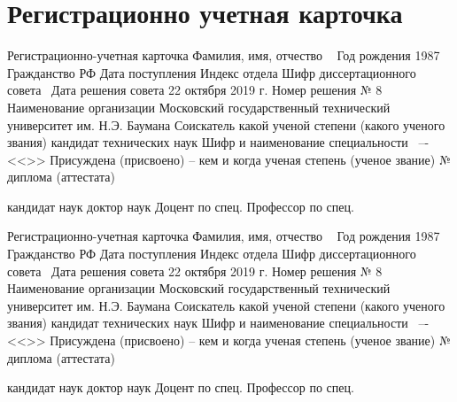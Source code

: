 
\section{Регистрационно учетная карточка}

Регистрационно-учетная карточка
Фамилия, имя, отчество	\thesisAuthorLastName~\thesisAuthorOtherNames
Год рождения
1987	Гражданство
РФ	Дата поступления	Индекс отдела
Шифр диссертационного совета \	Дата решения совета
22 октября 2019 г.	Номер решения
№ 8
Наименование организации Московский государственный
технический университет им. Н.Э. Баумана
Соискатель какой ученой степени
(какого ученого звания)
кандидат технических наук	Шифр и наименование специальности
\thesisSpecialtyNumber\ –- <<\thesisSpecialtyTitle>>
Присуждена (присвоено) – кем и когда ученая степень (ученое звание)
№ диплома (аттестата)

кандидат наук	
доктор наук	
Доцент по спец.	
Профессор по спец.	



Регистрационно-учетная карточка
Фамилия, имя, отчество	\thesisAuthorLastName~\thesisAuthorOtherNames
Год рождения
1987	Гражданство
РФ	Дата поступления	Индекс отдела
Шифр диссертационного совета \	Дата решения совета
22 октября 2019 г.	Номер решения
№ 8
Наименование организации Московский государственный
технический университет им. Н.Э. Баумана
Соискатель какой ученой степени
(какого ученого звания)
кандидат технических наук	Шифр и наименование специальности
\thesisSpecialtyNumber\ –- <<\thesisSpecialtyTitle>>
Присуждена (присвоено) – кем и когда ученая степень (ученое звание)
№ диплома (аттестата)

кандидат наук	
доктор наук	
Доцент по спец.	
Профессор по спец.	

\clearpage